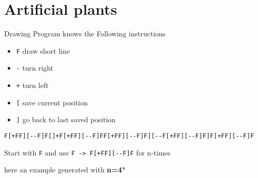 \documentclass[
]{article}
\author{}
\date{}
\providecommand{\tightlist}{%
  \setlength{\itemsep}{0pt}\setlength{\parskip}{0pt}}
\begin{document}
\hypertarget{artificial-plants}{%
\section{Artificial plants}\label{artificial-plants}}

Drawing Program knows the Following instructions

\begin{itemize}
\tightlist
\item
  \texttt{F} draw short line
\item
  \texttt{-} turn right
\item
  \texttt{+} turn left
\item
  \texttt{{[}} save current position
\item
  \texttt{{]}} go back to last saved position
\end{itemize}

\texttt{F{[}+FF{]}{[}-\/-F{]}F{[}{]}+F{[}+FF{]}{[}-\/-F{]}FF{[}+FF{]}{[}-\/-F{]}F{]}{[}-\/-F{[}+FF{]}{[}-\/-F{]}F{]}F{[}+FF{]}{[}-\/-F{]}F}

Start with \texttt{F} and use
\texttt{F\ -\textgreater{}\ F{[}+FF{]}{[}-\/-F{]}F} for n-times

here an example generated with \textbf{n=4}*
\end{document}
